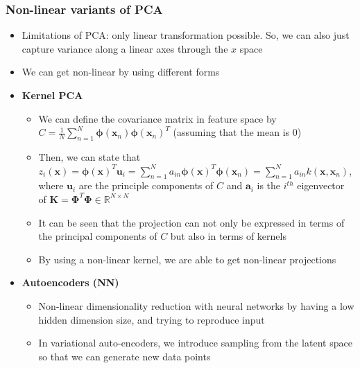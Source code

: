 \subsubsection{Non-linear variants of PCA}
\begin{itemize}
	\item Limitations of PCA: only linear transformation possible. So, we can also just capture variance along a linear axes through the $x$ space
	\item We can get non-linear by using different forms
	\item \textbf{Kernel PCA}
	\begin{itemize}
		\item We can define the covariance matrix in feature space by $C=\frac{1}{N}\sum\limits_{n=1}^{N} \bm{\phi}(\bm{x}_n)\bm{\phi}(\bm{x}_n)^T$ (assuming that the mean is 0)
		\item Then, we can state that $z_i(\bm{x}) = \bm{\phi}(\bm{x})^T \bm{u}_i = \sum_{n=1}^{N}a_{in}\bm{\phi}(\bm{x})^T \bm{\phi}(\bm{x}_n) =  \sum_{n=1}^{N}a_{in}k(\bm{x},\bm{x}_n)$, where $\bm{u}_i$ are the principle components of $C$ and $\bm{a}_i$ is the $i^{th}$ eigenvector of $\bm{K} = \bm{\Phi}^T\bm{\Phi} \in \mathbb{R}^{N \times N}$
		\item It can be seen that the projection can not only be expressed in terms of the principal components of $C$ but also in terms of kernels
		\item By using a non-linear kernel, we are able to get non-linear projections
	\end{itemize}
	\item \textbf{Autoencoders (NN)}
	\begin{itemize}
		\item Non-linear dimensionality reduction with neural networks by having a low hidden dimension size, and trying to reproduce input
		\item In variational auto-encoders, we introduce sampling from the latent space so that we can generate new data points
	\end{itemize}
\end{itemize}